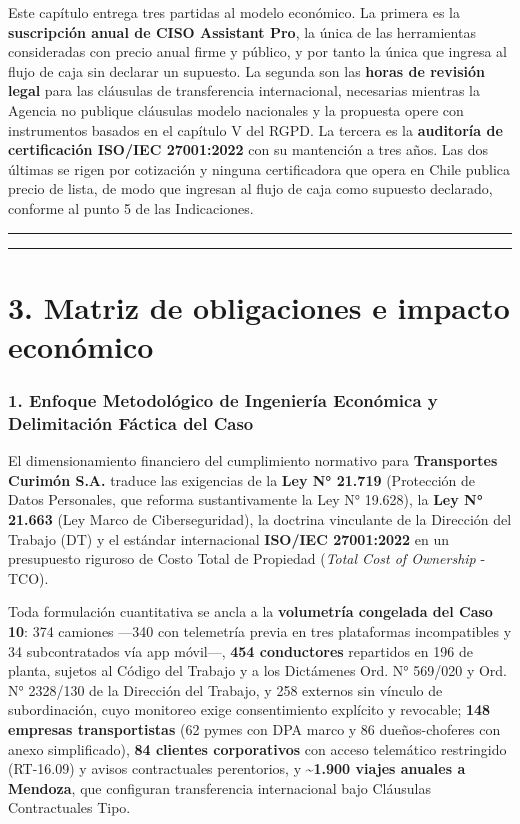 Este capítulo entrega tres partidas al modelo económico. La primera es la \textbf{suscripción anual de CISO Assistant Pro}, la única de las herramientas consideradas con precio anual firme y público, y por tanto la única que ingresa al flujo de caja sin declarar un supuesto. La segunda son las \textbf{horas de revisión legal} para las cláusulas de transferencia internacional, necesarias mientras la Agencia no publique cláusulas modelo nacionales y la propuesta opere con instrumentos basados en el capítulo V del RGPD. La tercera es la \textbf{auditoría de certificación ISO/IEC 27001:2022} con su mantención a tres años. Las dos últimas se rigen por cotización y ninguna certificadora que opera en Chile publica precio de lista, de modo que ingresan al flujo de caja como supuesto declarado, conforme al punto 5 de las Indicaciones.

\begin{center}\rule{0.5\linewidth}{0.5pt}\end{center}

\begin{center}\rule{0.5\linewidth}{0.5pt}\end{center}

\section{3. Matriz de obligaciones e impacto económico}\label{matriz-de-obligaciones-e-impacto-econuxf3mico}

\subsubsection{1. Enfoque Metodológico de Ingeniería Económica y Delimitación Fáctica del Caso}\label{enfoque-metodoluxf3gico-de-ingenieruxeda-econuxf3mica-y-delimitaciuxf3n-fuxe1ctica-del-caso}

El dimensionamiento financiero del cumplimiento normativo para \textbf{Transportes Curimón S.A.} traduce las exigencias de la \textbf{Ley N° 21.719} (Protección de Datos Personales, que reforma sustantivamente la Ley N° 19.628), la \textbf{Ley N° 21.663} (Ley Marco de Ciberseguridad), la doctrina vinculante de la Dirección del Trabajo (DT) y el estándar internacional \textbf{ISO/IEC 27001:2022} en un presupuesto riguroso de Costo Total de Propiedad (\emph{Total Cost of Ownership} - TCO).

Toda formulación cuantitativa se ancla a la \textbf{volumetría congelada del Caso 10}: 374 camiones ---340 con telemetría previa en tres plataformas incompatibles y 34 subcontratados vía app móvil---, \textbf{454 conductores} repartidos en 196 de planta, sujetos al Código del Trabajo y a los Dictámenes Ord. N° 569/020 y Ord. N° 2328/130 de la Dirección del Trabajo, y 258 externos sin vínculo de subordinación, cuyo monitoreo exige consentimiento explícito y revocable; \textbf{148 empresas transportistas} (62 pymes con DPA marco y 86 dueños-choferes con anexo simplificado), \textbf{84 clientes corporativos} con acceso telemático restringido (RT-16.09) y avisos contractuales perentorios, y \textbf{\textasciitilde1.900 viajes anuales a Mendoza}, que configuran transferencia internacional bajo Cláusulas Contractuales Tipo.

